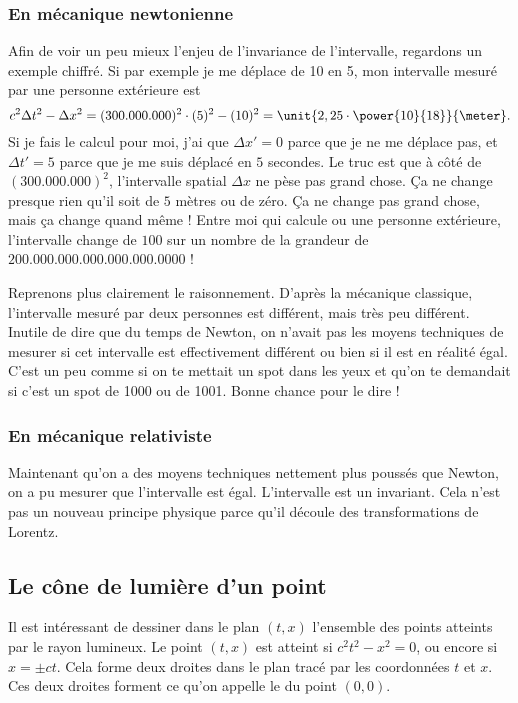 \subsubsection{En mécanique newtonienne}

Afin de voir un peu mieux l'enjeu de l'invariance de l'intervalle, regardons un exemple chiffré.  Si par exemple je me déplace de \unit{10}{\meter} en \unit{5}{\second}, mon intervalle mesuré par une personne extérieure est
\[
	c^2\Delta t^2-\Delta x^2=(300.000.000)^2\cdot (5)^2 - (10)^2=\unit{2,25\cdot \power{10}{18}}{\meter}.
\]
Si je fais le calcul pour moi, j'ai que \( \Delta x'=0\) parce que je ne me déplace pas, et \( \Delta t'=5\) parce que je me suis déplacé en \( 5\) secondes. Le truc est que à côté de \( (300.000.000)^2\), l'intervalle spatial \( \Delta x\) ne pèse pas grand chose. Ça ne change presque rien qu'il soit de \( 5\) mètres ou de zéro. Ça ne change pas grand chose, mais ça change quand même ! Entre moi qui calcule ou une personne extérieure, l'intervalle change de \( 100\) sur un nombre de la grandeur de \( 200.000.000.000.000.000.0000\) !

Reprenons plus clairement le raisonnement. D'après la mécanique classique, l'intervalle mesuré par deux personnes est différent, mais très peu différent. Inutile de dire que du temps de Newton, on n'avait pas les moyens techniques de mesurer si cet intervalle est effectivement différent ou bien si il est en réalité égal. C'est un peu comme si on te mettait un spot dans les yeux et qu'on te demandait si c'est un spot de \unit{1000}{\watt} ou de \unit{1001}{\watt}. Bonne chance pour le dire !

\subsubsection{En mécanique relativiste}

Maintenant qu'on a des moyens techniques nettement plus poussés que Newton, on a pu mesurer que l'intervalle est égal. L'intervalle est un invariant. Cela n'est pas un nouveau principe physique parce qu'il découle des transformations de Lorentz.


\subsection{Le cône de lumière d'un point}


Il est intéressant de dessiner dans le plan \( (t,x)\) l'ensemble des points atteints par le rayon lumineux. Le point \( (t,x)\) est atteint si \( c^2t^2-x^2=0\), ou encore si \( x=\pm ct\). Cela forme deux droites dans le plan tracé par les coordonnées \( t\) et \( x\). Ces deux droites forment ce qu'on appelle le  du point \( (0,0)\).

